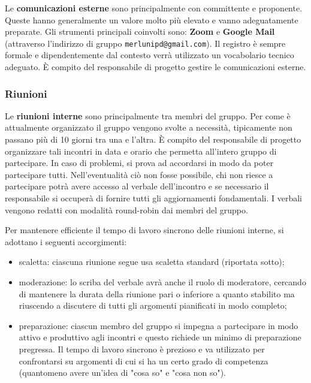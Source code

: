 Le \textbf{comunicazioni esterne} sono principalmente con committente e proponente. Queste hanno generalmente un valore molto più elevato e vanno adeguatamente preparate. Gli strumenti principali coinvolti sono: \textbf{Zoom} e \textbf{Google Mail} (attraverso l'indirizzo di gruppo \texttt{merlunipd@gmail.com}). Il registro è sempre formale e dipendentemente dal contesto verrà utilizzato un vocabolario tecnico adeguato. È compito del responsabile di progetto gestire le comunicazioni esterne.

\subsubsection{Riunioni}
Le \textbf{riunioni interne} sono principalmente tra membri del gruppo. Per come è attualmente organizzato il gruppo vengono svolte a necessità, tipicamente non passano più di 10 giorni tra una e l'altra. È compito del responsabile di progetto organizzare tali incontri in data e orario che permetta all'intero gruppo di partecipare. In caso di problemi, si prova ad accordarsi in modo da poter partecipare tutti. Nell'eventualità ciò non fosse possibile, chi non riesce a partecipare potrà avere accesso al verbale dell'incontro e se necessario il responsabile si occuperà di fornire tutti gli aggiornamenti fondamentali. I verbali vengono redatti con modalità round-robin dai membri del gruppo.

Per mantenere efficiente il tempo di lavoro sincrono delle riunioni interne, si adottano i seguenti accorgimenti:
\begin{itemize}
  \item scaletta: ciascuna riunione segue usa scaletta standard (riportata sotto);
  \item moderazione: lo scriba del verbale avrà anche il ruolo di moderatore, cercando di mantenere la durata della riunione pari o inferiore a quanto stabilito ma riuscendo a discutere di tutti gli argomenti pianificati in modo completo;
  \item preparazione: ciascun membro del gruppo si impegna a partecipare in modo attivo e produttivo agli incontri e questo richiede un minimo di preparazione pregressa. Il tempo di lavoro sincrono è prezioso e va utilizzato per confrontarsi su argomenti di cui si ha un certo grado di competenza (quantomeno avere un'idea di "cosa so" e "cosa non so").
\end{itemize}

